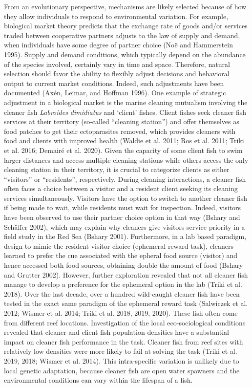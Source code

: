 \documentclass[
  12pt,
]{article}
\begin{document}
From an evolutionary perspective, mechanisms are likely selected because
of how they allow individuals to respond to environmental variation. For
example, biological market theory predicts that the exchange rate of
goods and/or services traded between cooperative partners adjusts to the
law of supply and demand, when individuals have some degree of partner
choice (Noë and Hammerstein 1995). Supply and demand conditions, which
typically depend on the abundance of the species involved, certainly
vary in time and space. Therefore, natural selection should favor the
ability to flexibly adjust decisions and behavioral output to current
market conditions. Indeed, such adjustments have been documented (Axén,
Leimar, and Hoffman 1996). One example of strategic adjustment in a
biological market is the marine cleaning mutualism involving the cleaner
fish \emph{Labroides dimidiatus} and `client' fishes. Client fishes seek
cleaner fish services at their territory (so-called ``cleaning
station'') and offer themselves as food patches to get their
ectoparasites removed, which provides cleaners with food and clients
with improved health (Waldie et al. 2011; Ros et al. 2011; Triki et al.
2016; Demairé et al. 2020). Given the capacity of some client fish to
swim larger distances and access multiple cleaning stations while others
access the only cleaning station in their territory, it is crucial to
categorize clients as either ``visitors'' or ``residents'',
respectively. During cleaning interactions, a cleaner fish often faces a
choice between a visitor and a resident client seeking its cleaning
services simultaneously. Visitors have the option to switch to another
cleaner fish if being made to wait, while residents must wait for
inspection. Indeed, visitors have been observed to use their partner
choice option in that way (Bshary and Schäffer 2002), which may explain
why cleaners give visitors service priority in a field study in the Red
Sea (Bshary 2001). Furthermore, in a lab based paradigm, design to mimic
the resident-visitor choice (ephemeral reward task), cleaners learned to
prefer the cue associated with the epheral food source (visitor) and
hence accessed both food sources, obtaining double the amount of food
(Bshary and Grutter 2002). However, further exploration revealed that
not all cleaner fish manage to develop a preference for the ephemeral
option in the lab (Triki et al. 2018). Over the last decade, over a
hundred wild-caught cleaner fish have been tested in the exact same
paradigm of the ephemeral reward task (Salwiczek et al. 2012; Wismer et
al. 2014; Triki et al. 2018, 2019, 2020). These fish often come from
different reef locations. Investigation of the local eco-sociological
conditions revealed that cleaner and client fish population densities
have a substantial impact on cleaner fish performance in the task.
Cleaner fish from reef sites with relatively low densities were more
likely to fail at solving the task (Triki et al. 2019, 2018; Wismer et
al. 2014). This intra-specific variation is unlikely due to local
genetic adaptation, because cleaner fish are open water spawners and the
environmental conditions can vary within the lifespan of a fish.
\end{document}
